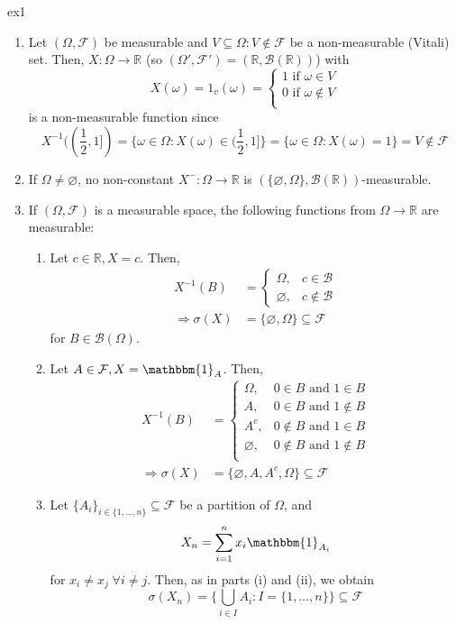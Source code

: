 \documentclass{article}
\newcommand{\R}{\mathbb{R}}
\newcommand{\inv}{^{-1}}
\begin{document}
	\begin{myex}{}{ex1}
		\begin{enumerate}
			\item Let $(\Omega, \mathcal{F})$ be measurable and $V\subseteq\Omega : V\notin\mathcal{F}$ be a non-measurable (Vitali) set. Then, $X : \Omega\to\R$ (so $(\Omega', \mathcal{F}')=(\R, \mathcal{B}(\R))$) with \[
				X(\omega)=1_v(\omega)=\begin{cases}
					1 \mbox{ if } \omega\in V\\
					0 \mbox{ if } \omega\notin V\\			
			\end{cases}
			\]
			is a non-measurable function since $$X^{-1}((\frac{1}{2}, 1])=\{\omega\in\Omega : X(\omega)\in(\frac{1}{2}, 1]\}=\{\omega\in\Omega : X(\omega)=1\}=V\notin\mathcal{F}$$
			
			\item If $\Omega\neq\varnothing$, no non-constant $X^- : \Omega\to\mathbb{R}$ is $(\{\varnothing, \Omega\}, \mathcal{B}(\mathbb{R}))$-measurable.
			
			\item If $(\Omega, \mathcal{F})$ is a measurable space, the following functions from $\Omega\to\R$ are measurable:
			\begin{enumerate}[label=(\roman*)]
				\item Let $c\in\R, X=c$. Then,
				\begin{align*}
					X\inv(B)&=\begin{cases}
						\Omega,&c\in\mathcal{B}\\
						\varnothing,&c\notin\mathcal{B}
					\end{cases}\\
					\Rightarrow\sigma(X)&=\{\varnothing, \Omega\}\subseteq\mathcal{F}
				\end{align*}
				for $B\in\mathcal{B}(\Omega)$.
				
				\item Let $A\in\mathcal{F}, X=\mathbbm{1}_A$. Then,
				\begin{align*}
					X\inv(B)&=\begin{cases}
						\Omega,&0\in B\mbox{ and }1\in B\\
						A,&0\in B\mbox{ and }1\notin B\\
						A^c,&0\notin B\mbox{ and }1\in B\\
						\varnothing,&0\notin B\mbox{ and }1\notin B\\
					\end{cases}\\
					\Rightarrow\sigma(X)&=\{\varnothing, A, A^c, \Omega\}\subseteq\mathcal{F}
				\end{align*}
				
				\item Let $\{A_i\}_{i\in\{1, \dots, n\}}\subseteq\mathcal{F}$ be a partition of $\Omega$, and $$X_n=\sum_{i=1}^nx_i\mathbbm{1}_{A_i}$$ for $x_i\neq x_j\;\forall i\neq j$. Then, as in parts (i) and (ii), we obtain $$\sigma(X_n)=\{\bigcup_{i\in I}A_i : I=\{1, \dots, n\}\}\subseteq\mathcal{F}$$
			\end{enumerate}
		\end{enumerate}
	\end{myex}
	
\end{document}
